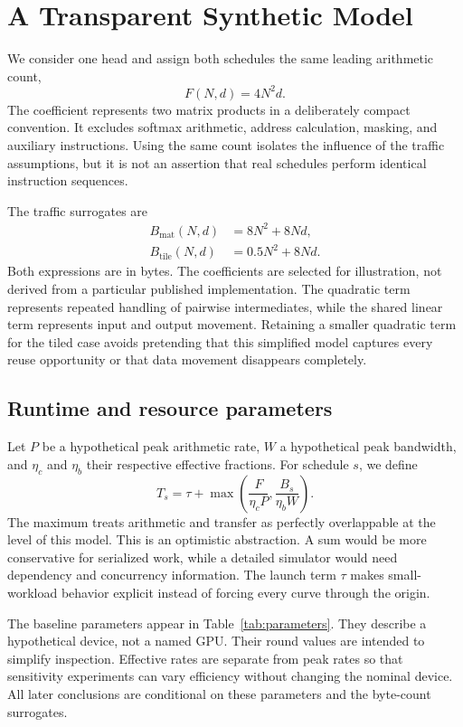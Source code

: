 \section{A Transparent Synthetic Model}
\label{sec:model}
We consider one head and assign both schedules the same leading arithmetic count,
\begin{equation}
 F(N,d)=4N^2d.
 \label{eq:flops}
\end{equation}
The coefficient represents two matrix products in a deliberately compact convention. It excludes softmax arithmetic, address calculation, masking, and auxiliary instructions. Using the same count isolates the influence of the traffic assumptions, but it is not an assertion that real schedules perform identical instruction sequences.

The traffic surrogates are
\begin{align}
 B_{\mathrm{mat}}(N,d)&=8N^2+8Nd,\\
 B_{\mathrm{tile}}(N,d)&=0.5N^2+8Nd.
 \label{eq:bytes}
\end{align}
Both expressions are in bytes. The coefficients are selected for illustration, not derived from a particular published implementation. The quadratic term represents repeated handling of pairwise intermediates, while the shared linear term represents input and output movement. Retaining a smaller quadratic term for the tiled case avoids pretending that this simplified model captures every reuse opportunity or that data movement disappears completely.

\subsection{Runtime and resource parameters}
Let $P$ be a hypothetical peak arithmetic rate, $W$ a hypothetical peak bandwidth, and $\eta_c$ and $\eta_b$ their respective effective fractions. For schedule $s$, we define
\begin{equation}
 T_s=\tau+\max\left(\frac{F}{\eta_cP},\frac{B_s}{\eta_bW}\right).
 \label{eq:time}
\end{equation}
The maximum treats arithmetic and transfer as perfectly overlappable at the level of this model. This is an optimistic abstraction. A sum would be more conservative for serialized work, while a detailed simulator would need dependency and concurrency information. The launch term $\tau$ makes small-workload behavior explicit instead of forcing every curve through the origin.

The baseline parameters appear in Table~\ref{tab:parameters}. They describe a hypothetical device, not a named GPU. Their round values are intended to simplify inspection. Effective rates are separate from peak rates so that sensitivity experiments can vary efficiency without changing the nominal device. All later conclusions are conditional on these parameters and the byte-count surrogates.

